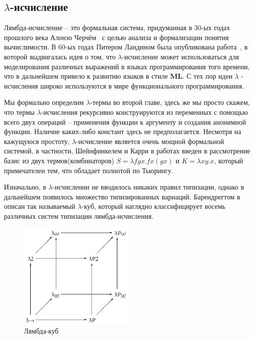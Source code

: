 \subsection{\texorpdfstring{$\lambda$}{Лямбда}-исчисление}
\label{sec:lambda}

Лямбда-исчисление -- это формальная система, придуманная в 30-ых годах прошлого века Алонзо Черчём~\cite{church1936unsolvable} с целью анализа и формализации понятия вычислимости. В 60-ых годах Питером Ландином была опубликована работа~\cite{landin1964mechanical}, в которой выдвигалась идея о том, что $\lambda$-исчисление может использоваться для моделирования различных выражений в языках программирования того времени, что в дальнейшем привело к развитию языков в стиле \textbf{ML}. С тех пор идеи $\lambda$ - исчисления широко используются в мире функционального программирования.

Мы формально определим $\lambda$-термы во второй главе, здесь же мы просто скажем, что термы $\lambda$-исчисления рекурсивно конструируются из переменных с помощью всего двух операций -- применения функции к аргументу и создания анонимной функции. Наличие каких-либо констант здесь не предполагается. Несмотря на кажущуюся простоту, $\lambda$-исчисление является очень мощной формальной системой, в частности, Шейнфинкелем и Карри в работах \cite{schonfinkel1924bausteine, curry1930grundlagen} введен в рассмотрение базис из двух термов(комбинаторов) $S = \lambda f g x. f x (g x)$ и $K = \lambda x y. x$, который примечателен тем, что обладает полнотой по Тьюрингу.

Изначально, в $\lambda$-исчислении не вводилось никаких правил типизации, однако в дальнейшем появилось множество типизированных вариаций. Барендрегтом в~\cite{barendregt1993lambda} описан так называемый $\lambda$-куб, который наглядно классифицирует восемь различных систем типизации лямбда-исчисления.

\begin{figure}[H]
  \centering
  \includegraphics[width=0.5\textwidth]{img/Lambda_cube.png}
  \caption{Лямбда-куб}
\end{figure}

